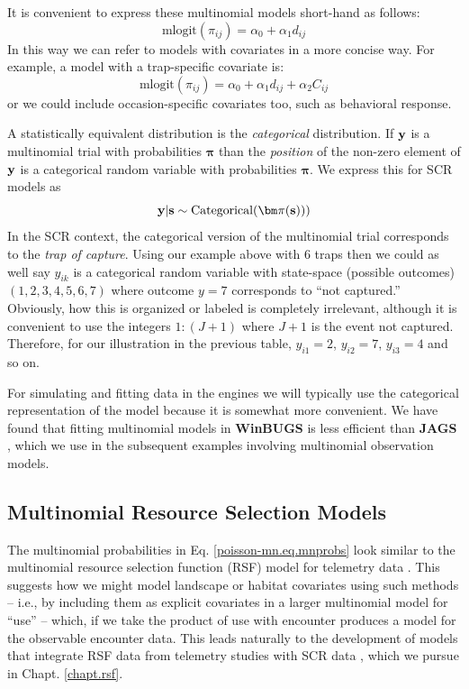 It is convenient to express these multinomial models short-hand as follows:
\[
\mbox{mlogit}( \pi_{ij} ) = \alpha_{0} + \alpha_{1} d_{ij}
\]
In this way we can refer to models with covariates in a more concise
way. For example, a model with a trap-specific covariate is:
\[
\mbox{mlogit}( \pi_{ij} ) = \alpha_{0} + \alpha_{1} d_{ij} + \alpha_{2} C_{ij}
\]
or we could include occasion-specific covariates too, such as
behavioral response. 

A statistically equivalent distribution is the {\it categorical}
distribution.  If ${\bf y}$ is a multinomial trial with probabilities
${\bm \pi}$ than the {\it position} of the non-zero element of ${\bf
  y}$ is a categorical random variable with probabilities ${\bm \pi}$.
We express this for SCR models as
\[
{\bf y}|{\bf s} \sim \mbox{Categorical}( {\bm \pi}({\bf s})) )
\]
In the SCR context, the categorical version of the
multinomial trial corresponds to the {\it trap of capture}.  Using our
example above with 6 traps then we
could as well say $y_{ik}$ is a categorical random variable with
state-space (possible outcomes) $(1,2,3,4,5,6,7)$ where outcome $y=7$
corresponds to ``not captured.'' Obviously, how this is organized or
labeled is completely irrelevant, although it is convenient to use the
integers $1:(J+1)$ where $J+1$ is the event not captured.  Therefore,
for our illustration in the previous table, $y_{i1} = 2$, $y_{i2} =
7$, $y_{i3} = 4$ and so on.

For simulating and fitting data in the \bugs engines we will typically use
the categorical representation of the model because it is somewhat
more convenient.  We have found that fitting multinomial models in
{\bf WinBUGS} is less efficient than {\bf JAGS}
\citep{converse_royle:2013}, which we use in the subsequent examples
involving multinomial 
observation models.


\subsection{Multinomial  Resource Selection Models}

The multinomial probabilities in Eq. \ref{poisson-mn.eq.mnprobs}
look similar to the 
multinomial resource selection function (RSF) model for telemetry data
\citep{manly_etal:2002, lele_keim:2006}.  This suggests how we might
model landscape or habitat covariates using such methods -- i.e., by
including them as explicit covariates in a larger multinomial model
for ``use'' -- which, if we take the product of use with encounter
produces a model for the observable encounter data. This 
leads naturally to the development of models that integrate RSF data
from telemetry studies with SCR data \citep{royle_chandler:2012},
which we pursue in Chapt. \ref{chapt.rsf}.





